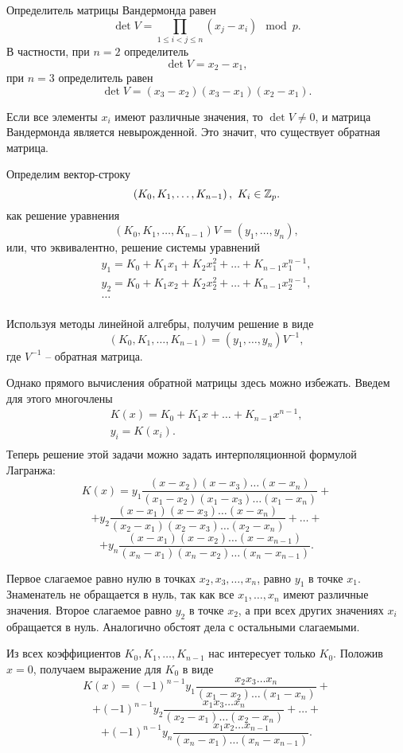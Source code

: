 Определитель матрицы Вандермонда равен
    \[ \det V = \prod_{1\le i < j\le n} \left(x_j - x_i \right) \mod p. \]
В частности, при $n=2$ определитель
    \[ \det V = x_2 - x_1, \]
при $n=3$ определитель равен
    \[ \det V = (x_3 - x_2) (x_3 - x_1) (x_2 - x_1). \]

Если все элементы $x_{i}$ имеют различные значения, то $\det V \ne 0$, и матрица Вандермонда является невырожденной. Это значит, что существует обратная матрица.

Определим вектор-строку
    \[ \left(K_{0}, K_{1},  \ldots,  K_{n-1}\right), ~ K_{i} \in \mathbb{Z}_{p}. \]
как решение уравнения
    \[ (K_{0} ,K_{1} ,  \ldots, K{}_{n-1} )V=(y_{1} ,  \ldots, y_{n} ), \]
или, что эквивалентно, решение системы уравнений
\[ \begin{array}{l}
    y_1 = K_0 + K_1 x_1 + K_2 x_1^2 + \dots + K_{n-1} x_1^{n-1}, \\
    y_2 = K_0 + K_1 x_2 + K_2 x_2^2 + \dots + K_{n-1} x_2^{n-1}, \\
    \dots \\
\end{array} \]

Используя методы линейной алгебры, получим решение в виде
    \[ (K_{0} ,K_{1} ,  \ldots,  K_{n-1} )=(y_{1} ,  \ldots,  y_{n} )V^{-1}, \]
где $V^{-1}$ -- обратная матрица.

Однако прямого вычисления обратной матрицы здесь можно избежать.  Введем для этого многочлены
\[ \begin{array}{c}
    K(x)= K_{0} +K_{1} x+ \ldots +K_{n-1} x^{n-1}, \\
    y_{i} =K(x_{i}). \\
\end{array} \]
Теперь решение этой задачи можно задать интерполяционной формулой Лагранжа:
\[
    K(x) = y_1 \frac{(x - x_2)(x - x_3) \dots (x - x_n)} {(x_1-x_2)(x_1-x_3) \dots (x_1-x_n)} +
\] \[
    + y_2 \frac{(x-x_1)(x-x_3) \dots (x-x_n)} {(x_2-x_1)(x_2-x_3) \dots (x_2-x_n)} + \dots +
\] \[
    + y_n \frac{(x-x_1)(x-x_2) \dots (x-x_{n-1})} {(x_n-x_1)(x_n-x_2) \dots (x_n-x_{n-1})}.
\]

Первое слагаемое равно нулю в точках $x_2, x_3, \dots, x_n$,   равно $y_1$ в точке $x_1$. Знаменатель не обращается в нуль, так как все $x_1, \dots, x_n$ имеют различные значения. Второе слагаемое равно $y_2$ в точке $x_2$, а при всех других значениях $x_i$ обращается в нуль. Аналогично обстоят дела с остальными слагаемыми.

Из всех коэффициентов $K_0, K_1, \dots, K_{n-1}$ нас интересует только $K_0$.
Положив $x=0$, получаем выражение  для $K_{0} $ в виде
\[
    K(x) = (-1)^{n-1} y_1 \frac{x_2 x_3 \dots x_n} {(x_1-x_2) \dots (x_1-x_n)} +
\] \[
    + (-1)^{n-1} y_2 \frac{x_1 x_3 \dots x_n} {(x_2-x_1) \dots (x_2-x_n)} + \dots +
\] \[
    + (-1)^{n-1} y_n \frac{x_1 x_2 \dots x_{n-1}} {(x_n-x_1) \dots (x_n-x_{n-1})}.
\]

